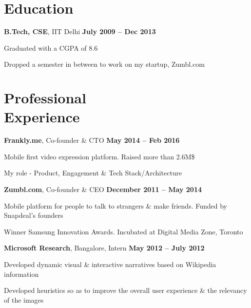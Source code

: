 \documentclass[margin,line]{resume}
\begin{document}
\begin{resume}
    \section{\mysidestyle Education}

    \textbf{B.Tech, CSE}, IIT Delhi \hfill \textbf{July 2009 -- Dec 2013}
    \begin{list2}
        \item Graduated with a CGPA of 8.6
        \item Dropped a semester in between to work on my startup, Zumbl.com
    \end{list2}\vspace{-1.5mm}

    \section{\mysidestyle Professional\\Experience}
    \textbf{Frankly.me}, Co-founder \& CTO \hfill \textbf{May 2014 -- Feb 2016}
    \begin{list2}
        \item Mobile first video expression platform. Raised more than 2.6M\$
        \item My role - Product, Engagement \& Tech Stack/Architecture
    \end{list2}\vspace{-1.5mm}

    \textbf{Zumbl.com}, Co-founder \& CEO \hfill \textbf{December 2011 -- May 2014}
    \begin{list2}
        \item Mobile platform for people to talk to strangers \& make friends. Funded by Snapdeal's founders
        \item Winner Samsung Innovation Awards. Incubated at Digital Media Zone, Toronto
    \end{list2}\vspace{-1.5mm}

    \textbf{Microsoft Research}, Bangalore, Intern \hfill \textbf{May 2012 -- July 2012}
    \begin{list2}
        \item Developed dynamic visual \& interactive narratives based on Wikipedia information
        \item Developed heuristics so as to improve the overall user experience \& the relevancy of the images
    \end{list2}\vspace{-1.5mm}


\end{resume}
\end{document}

